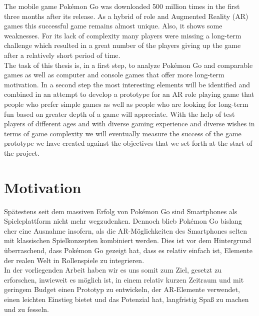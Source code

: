 \documentclass[extern,palatino]{cgBA}
\begin{document}
The mobile game Pokémon Go was downloaded 500 million times in the first three months after its release. As a hybrid of role and Augmented Reality (AR) games this successful game remains almost unique. Also, it shows some weaknesses. For its lack of complexity many players were missing a long-term challenge which resulted in a great number of the players giving up the game after a relatively short period of time.
\\The task of this thesis is, in a first step, to analyze Pokémon Go and comparable games as well as computer and console games that offer more long-term motivation. In a second step the most interesting elements will be identified and combined in an attempt to develop a prototype for an AR role playing game that people who prefer simple games as well as people who are looking for long-term fun based on greater depth of a game will appreciate. With the help of test players of different ages and with diverse gaming experience and diverse wishes in terms of game complexity we will eventually measure the success of the game prototype we have created against the objectives that we set forth at the start of the project.
\newpage
\section{Motivation}
Spätestens seit dem massiven Erfolg von Pokémon Go sind Smartphones als Spieleplattform nicht mehr wegzudenken. Dennoch blieb Pokémon Go bislang eher eine Ausnahme insofern, als die AR-Möglichkeiten des Smartphones selten mit klassischen Spielkonzepten kombiniert werden. Dies ist vor dem Hintergrund überraschend, dass Pokémon Go gezeigt hat, dass es relativ einfach ist, Elemente der realen Welt in Rollenspiele zu integrieren. 
\\In der vorliegenden Arbeit haben wir es uns somit zum Ziel, gesetzt zu erforschen, inwieweit es möglich ist, in einem relativ kurzen Zeitraum und mit geringem Budget einen Prototyp zu entwickeln, der AR-Elemente verwendet, einen leichten Einstieg bietet und das Potenzial hat, langfristig Spaß zu machen und zu fesseln.
\newpage
\end{document}
